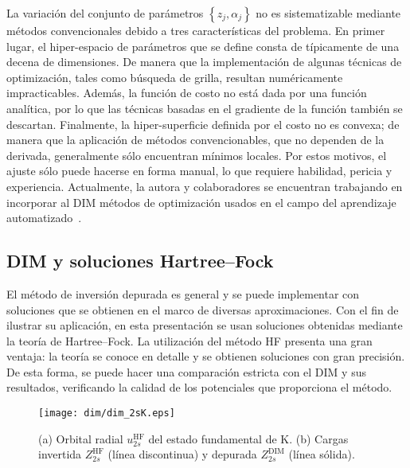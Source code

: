 La variación del conjunto de parámetros $\left\{z_j,\alpha_j\right\}$ no 
es sistematizable mediante métodos convencionales debido a tres 
características del problema. En primer lugar, el hiper-espacio de 
parámetros que se define consta de típicamente de una decena de 
dimensiones. De manera 
que la implementación de algunas técnicas de optimización, tales como 
búsqueda de grilla, resultan numéricamente impracticables. Además,
la función de costo no está dada por una función analítica, por lo que 
las técnicas basadas en el gradiente de la función también se descartan. 
Finalmente, la hiper-superficie definida por el costo no es convexa; de 
manera que la aplicación de métodos convencionables, que no dependen de 
la derivada, generalmente sólo encuentran mínimos locales. Por estos
motivos, el ajuste sólo puede hacerse en forma manual, lo que  
requiere habilidad, pericia y experiencia. Actualmente, la autora y 
colaboradores se encuentran trabajando en incorporar al DIM métodos de 
optimización usados en el campo del aprendizaje 
automatizado~\cite{DiFilippo:19}.

\subsection{DIM y soluciones Hartree--Fock}
\label{subsec:invHF}

El método de inversión depurada es general y se puede implementar con 
soluciones que se obtienen en el marco de diversas aproximaciones. Con 
el fin de ilustrar su aplicación, en esta presentación se usan 
soluciones obtenidas mediante la teoría de Hartree--Fock. La utilización 
del método HF presenta una gran ventaja: la teoría se conoce en detalle 
y se obtienen soluciones 
con gran precisión. De esta forma, se puede hacer una comparación 
estricta con el DIM y sus resultados, verificando la calidad de los 
potenciales que proporciona el método.

\begin{figure}[t]
\centering
\texttt{[image: dim/dim\_2sK.eps]} 
\caption[Orbital radial y carga efectiva correspondiente.]
{(a) Orbital radial $u_{2s}^{\mathrm{HF}}$ del estado fundamental de K.
(b) Cargas invertida $Z_{2s}^{\mathrm{HF}}$ (línea discontinua) 
y depurada $Z_{2s}^{\mathrm{DIM}}$ (línea sólida).}
\label{fig:2sK}
\end{figure}

